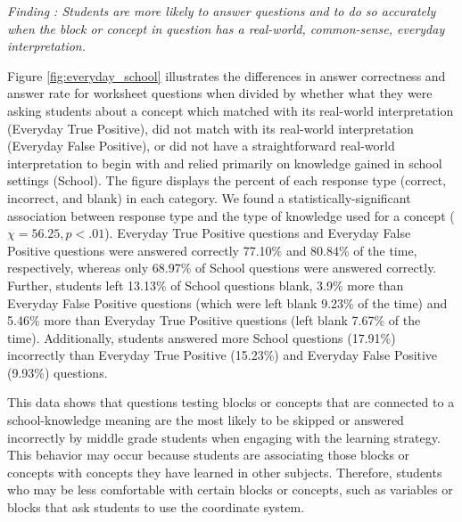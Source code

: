 {
\textit{Finding : Students are more likely to answer questions and to do so accurately when the block or concept in question has a real-world, common-sense, everyday interpretation.}

Figure \ref{fig:everyday_school} illustrates the differences in answer correctness and answer rate for \ts{} worksheet questions when divided by whether what they were asking students about a concept which matched with its real-world interpretation (Everyday True Positive), did not match with its real-world interpretation (Everyday False Positive), or did not have a straightforward real-world interpretation to begin with and relied primarily on knowledge gained in school settings (School). The figure displays the percent of each response type (correct, incorrect, and blank) in each category. We found a statistically-significant association between response type and the type of knowledge used for a concept (\begin{math}\chi=56.25, p<.01\end{math}). Everyday True Positive questions and Everyday False Positive questions were answered correctly 77.10\% and 80.84\% of the time, respectively, whereas only 68.97\% of School questions were answered correctly. Further, students left 13.13\% of School questions blank, 3.9\% more than Everyday False Positive questions (which were left blank 9.23\% of the time) and 5.46\% more than Everyday True Positive questions (left blank 7.67\% of the time). Additionally, students answered more School questions (17.91\%) incorrectly than Everyday True Positive (15.23\%) and Everyday False Positive (9.93\%) questions.

This data shows that questions testing blocks or concepts that are connected to a school-knowledge meaning are the most likely to be skipped or answered incorrectly by middle grade students when engaging with the \ts{} learning strategy. This behavior may occur because students are associating those blocks or concepts with concepts they have learned in other subjects. Therefore, students who may be less comfortable with certain blocks or concepts, such as variables or blocks that ask students to use the coordinate system.


}

